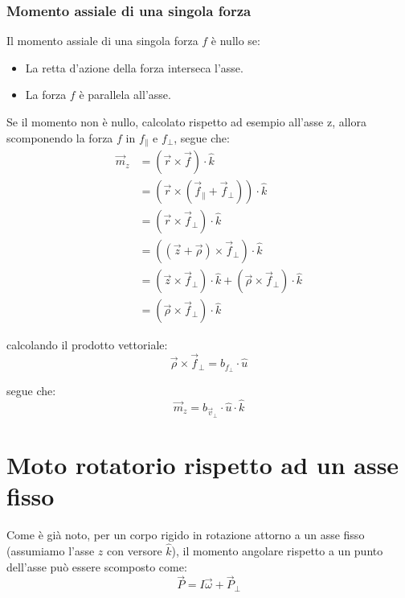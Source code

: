 \documentclass[11pt, a4paper, openright]{book}
\theoremstyle{plain}
\theoremstyle{definition}
\begin{document}
\newpage

\subsubsection{Momento assiale di una singola forza}
Il momento assiale di una singola forza $f$ è nullo se:
\begin{itemize}
    \item La retta d'azione della forza interseca l'asse.
    \item La forza $f$ è parallela all'asse.
\end{itemize}
Se il momento non è nullo, calcolato rispetto ad esempio all'asse z, allora scomponendo la forza $f$ in $f_\parallel$ e $f_\perp$, segue che:
\begin{align}
    \vec{m}_z & = (\vec{r} \times \vec{f}) \cdot \hat{k} \\
              & = (\vec{r} \times (\vec{f}_\parallel + \vec{f}_\perp)) \cdot \hat{k} \\
              & = (\vec{r} \times \vec{f}_\perp) \cdot \hat{k} \\
              & = ((\vec{z} + \vec{\rho}) \times \vec{f}_\perp) \cdot \hat{k} \\
              & = (\vec{z} \times \vec{f}_\perp) \cdot \hat{k} + (\vec{\rho} \times \vec{f}_\perp) \cdot \hat{k} \\
              & = (\vec{\rho} \times \vec{f}_\perp) \cdot \hat{k}
\end{align}

calcolando il prodotto vettoriale:
\begin{equation}
    \vec{\rho} \times \vec{f}_\perp = b_{f_\perp} \cdot \hat{u}
\end{equation}

segue che:
\begin{equation}
    \vec{m}_z = b_{\vec{v}_\perp} \cdot \hat{u} \cdot \hat{k}
\end{equation}

\section{Moto rotatorio rispetto ad un asse fisso}

Come è già noto, per un corpo rigido in rotazione attorno a un asse fisso (assumiamo l'asse $z$ con versore $\hat{k}$), il momento angolare rispetto a un punto dell'asse può essere scomposto come:
\begin{equation}
    \vec{P} = I \vec{\omega} + \vec{P}_\perp
\end{equation}
\end{document}

